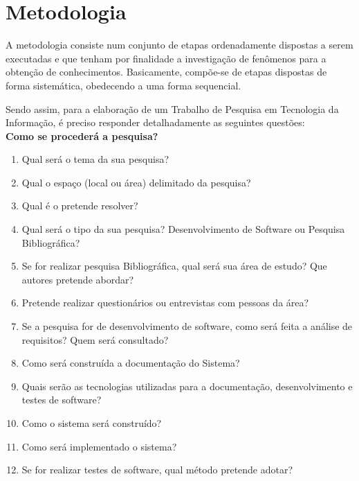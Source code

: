 \chapter{Metodologia}  \label{cap:04}

A metodologia consiste num conjunto de etapas ordenadamente dispostas a serem executadas e que tenham por finalidade a investigação de fenômenos para a obtenção de conhecimentos. Basicamente, compõe-se de etapas dispostas de forma sistemática, obedecendo a uma forma sequencial. 

Sendo assim, para a elaboração de um Trabalho de Pesquisa em Tecnologia da Informação, é preciso responder detalhadamente as seguintes questões:\\

\textbf{Como se procederá a pesquisa?}

\begin{enumerate}
    \item Qual será o tema da sua pesquisa? 
    \item Qual o espaço (local ou área) delimitado da pesquisa? 
    \item Qual é o pretende resolver?
    \item Qual será o tipo da sua pesquisa? Desenvolvimento de Software ou Pesquisa Bibliográfica?
    \item Se for realizar pesquisa Bibliográfica, qual será sua área de estudo? Que autores pretende abordar?
    \item Pretende realizar questionários ou entrevistas com pessoas da área?
    \item Se a pesquisa for de desenvolvimento de software, como será feita a análise de requisitos? Quem será consultado? 
    \item Como será construída a documentação do Sistema?
    \item Quais serão as tecnologias utilizadas para a documentação, desenvolvimento e testes de software?
    \item Como o sistema será construído?
    \item Como será implementado o sistema?
    \item Se for realizar testes de software, qual método pretende adotar?
\end{enumerate}
